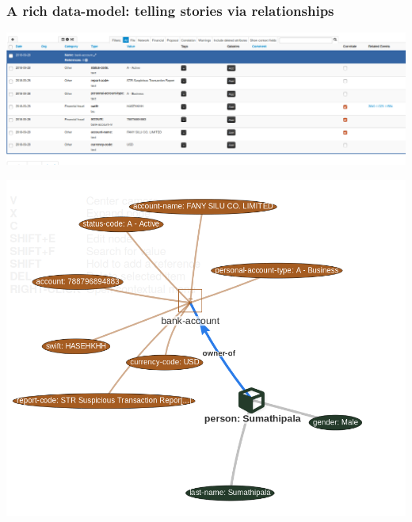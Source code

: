 \begin{frame}
        \frametitle{A rich data-model: telling stories via relationships}
        \includegraphics[scale=0.25]{screenshots/bankaccount.png}
        \begin{center}
            \includegraphics[scale=0.18]{screenshots/bankview.png}
        \end{center}
\end{frame}

